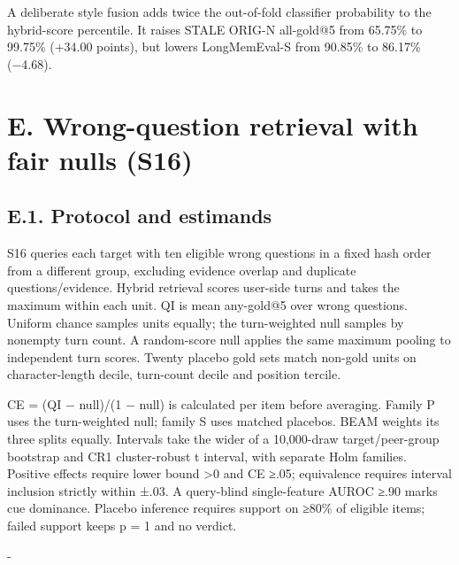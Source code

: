 \documentclass[11pt]{article}
\makeatletter
\newcommand{\KeepTable}[2]{\par\penalty-100\begingroup
  \dimen@ii\pagegoal \advance\dimen@ii-\pagetotal
  \ifdim #1\baselineskip>\dimen@ii
    \ifdim \dimen@ii<0.33\textheight
      \ifdim \dimen@ii>\z@ \vfil\fi \break
    \else
      \ifdim #2\baselineskip>\dimen@ii \ifdim \dimen@ii>\z@ \vfil\fi \break\fi
    \fi
  \fi\endgroup}
\makeatother
\begin{document}
A deliberate style fusion adds twice the out-of-fold classifier probability to the hybrid-score percentile. It raises STALE ORIG-N all-gold@5 from 65.75\% to 99.75\% (+34.00 points), but lowers LongMemEval-S from 90.85\% to 86.17\% (−4.68).

\label{appendix-e}

\section{E. Wrong-question retrieval with fair nulls (S16)}\label{e.-wrong-question-retrieval-with-fair-nulls-s16}

\subsection{E.1. Protocol and estimands}\label{e.1.-protocol-and-estimands}

S16 queries each target with ten eligible wrong questions in a fixed hash order from a different group, excluding evidence overlap and duplicate questions/\allowbreak{}evidence. Hybrid retrieval scores user-side turns and takes the maximum within each unit. QI is mean any-gold@5 over wrong questions. Uniform chance samples units equally; the turn-weighted null samples by nonempty turn count. A random-score null applies the same maximum pooling to independent turn scores. Twenty placebo gold sets match non-gold units on character-length decile, turn-count decile and position tercile.

CE = (QI − null)/\allowbreak{}(1 − null) is calculated per item before averaging. Family P uses the turn-weighted null; family S uses matched placebos. BEAM weights its three splits equally. Intervals take the wider of a 10,000-draw target/\allowbreak{}peer-group bootstrap and CR1 cluster-robust t interval, with separate Holm families. Positive effects require lower bound \textgreater0 and CE ≥.05; equivalence requires interval inclusion strictly within ±.03. A query-blind single-feature AUROC ≥.90 marks cue dominance. Placebo inference requires support on ≥80\% of eligible items; failed support keeps p = 1 and no verdict.

\KeepTable{22}{0}

\par\begingroup
\small
\end{document}
